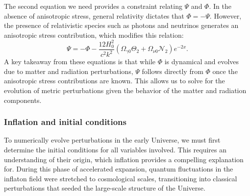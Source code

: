 \documentclass{aa}
\numberwithin{equation}{section}
\numberwithin{table}{section}
\numberwithin{figure}{section}
\begin{document}
The second equation we need provides a constraint relating $\Psi$ and $\Phi$. In the absence of anisotropic stress, general relativity dictates that $\Phi = -\Psi$. However, the presence of relativistic species such as photons and neutrinos generates an anisotropic stress contribution, which modifies this relation:
\begin{equation}
\Psi = -\Phi - \frac{12 H_0^2}{c^2 k^2} \left( \Omega_{\gamma0} \Theta_2 + \Omega_{\nu0} \mathcal{N}_2 \right)e^{-2x}. \label{eq: Psi}
\end{equation}
A key takeaway from these equations is that while $\Phi$ is dynamical and evolves due to matter and radiation perturbations, $\Psi$ follows directly from $\Phi$ once the anisotropic stress contributions are known. This allows us to solve for the evolution of metric perturbations given the behavior of the matter and radiation components. 





\subsubsection{Inflation and initial conditions}\label{subsubsec: III theory inflation}
To numerically evolve perturbations in the early Universe, we must first determine the initial conditions for all variables involved. This requires an understanding of their origin, which inflation provides a compelling explanation for. During this phase of accelerated expansion, quantum fluctuations in the inflaton field were stretched to cosmological scales, transitioning into classical perturbations that seeded the large-scale structure of the Universe. 
\end{document}
